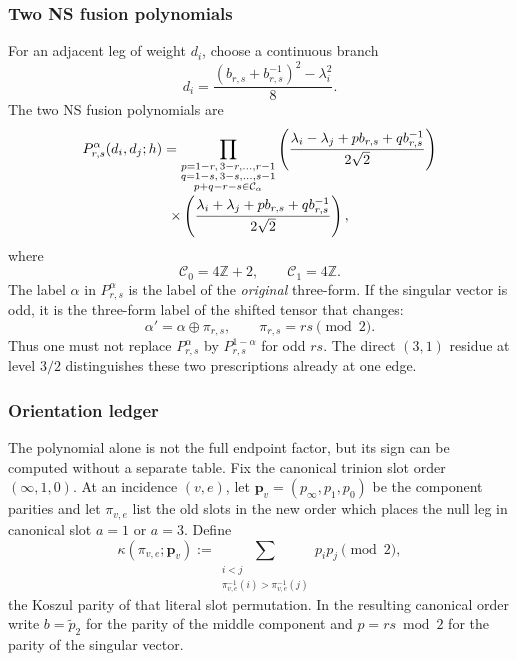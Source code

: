 \documentclass[11pt]{article}
\begin{document}
\subsubsection{Two NS fusion polynomials}

For an adjacent leg of weight \(d_i\), choose a continuous branch
\begin{equation}
 d_i=\frac{(b_{r,s}+b_{r,s}^{-1})^2-\lambda_i^2}{8}.
 \label{eq:external-momentum}
\end{equation}
The two NS fusion polynomials are
\begin{multline}
 P_{r,s}^{\alpha}(d_i,d_j;h)
 =\prod_{\substack{
 p=1-r,\,3-r,\ldots,r-1\\
 q=1-s,\,3-s,\ldots,s-1\\
 p+q-r-s\in\mathcal C_\alpha}}
 \left(
  \frac{\lambda_i-\lambda_j+p b_{r,s}+q b_{r,s}^{-1}}
       {2\sqrt2}
 \right)
 \notag\\[-0.2em]
 \times
 \left(
  \frac{\lambda_i+\lambda_j+p b_{r,s}+q b_{r,s}^{-1}}
       {2\sqrt2}
 \right),
 \label{eq:fusion-polynomial}
\end{multline}
where
\begin{equation}
 \mathcal C_0=4\mathbb Z+2,
 \qquad
 \mathcal C_1=4\mathbb Z.
 \label{eq:fusion-congruence}
\end{equation}
The label \(\alpha\) in \(P_{r,s}^{\alpha}\) is the label of the
\emph{original} three-form.  If the singular vector is odd, it is the
three-form label of the shifted tensor that changes:
\begin{equation}
 \alpha' = \alpha\oplus \pi_{r,s},
 \qquad \pi_{r,s}=rs\pmod2.
 \label{eq:null-sector-transport}
\end{equation}
Thus one must not replace \(P_{r,s}^{\alpha}\) by
\(P_{r,s}^{1-\alpha}\) for odd \(rs\).  The direct \((3,1)\) residue at
level \(3/2\) distinguishes these two prescriptions already at one edge.

\subsubsection{Orientation ledger}

The polynomial alone is not the full endpoint factor, but its sign can be
computed without a separate table.  Fix the canonical trinion slot order
\((\infty,1,0)\).  At an incidence \((v,e)\), let
\(\bm p_v=(p_\infty,p_1,p_0)\) be the component parities and let
\(\pi_{v,e}\) list the old slots in the new order which places the null leg
in canonical slot \(a=1\) or \(a=3\).  Define
\begin{equation}
 \kappa(\pi_{v,e};\bm p_v)
 :=\sum_{\substack{i<j\\
       \pi_{v,e}^{-1}(i)>\pi_{v,e}^{-1}(j)}}p_i p_j
 \pmod2,
 \label{eq:endpoint-koszul-permutation}
\end{equation}
the Koszul parity of that literal slot permutation.  In the resulting
canonical order write \(b=\widetilde p_2\) for the parity of the middle
component and \(p=rs\bmod2\) for the parity of the singular vector.
\end{document}
